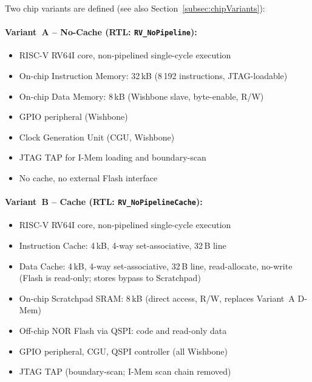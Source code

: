 Two chip variants are defined (see also Section~\ref{subsec:chipVariants}):

\paragraph{Variant~A -- No-Cache (RTL: \texttt{RV\_NoPipeline}):}
\begin{itemize}
  \item RISC-V RV64I core, non-pipelined single-cycle execution
  \item On-chip Instruction Memory: 32\,kB (8\,192 instructions, JTAG-loadable)
  \item On-chip Data Memory: 8\,kB (Wishbone slave, byte-enable, R/W)
  \item GPIO peripheral (Wishbone)
  \item Clock Generation Unit (CGU, Wishbone)
  \item JTAG TAP for I-Mem loading and boundary-scan
  \item No cache, no external Flash interface
\end{itemize}

\paragraph{Variant~B -- Cache (RTL: \texttt{RV\_NoPipelineCache}):}
\begin{itemize}
  \item RISC-V RV64I core, non-pipelined single-cycle execution
  \item Instruction Cache: 4\,kB, 4-way set-associative, 32\,B line
  \item Data Cache: 4\,kB, 4-way set-associative, 32\,B line,
        read-allocate, no-write (Flash is read-only; stores bypass to Scratchpad)
  \item On-chip Scratchpad SRAM: 8\,kB (direct access, R/W, replaces Variant~A D-Mem)
  \item Off-chip NOR Flash via QSPI: code and read-only data
  \item GPIO peripheral, CGU, QSPI controller (all Wishbone)
  \item JTAG TAP (boundary-scan; I-Mem scan chain removed)
\end{itemize}
